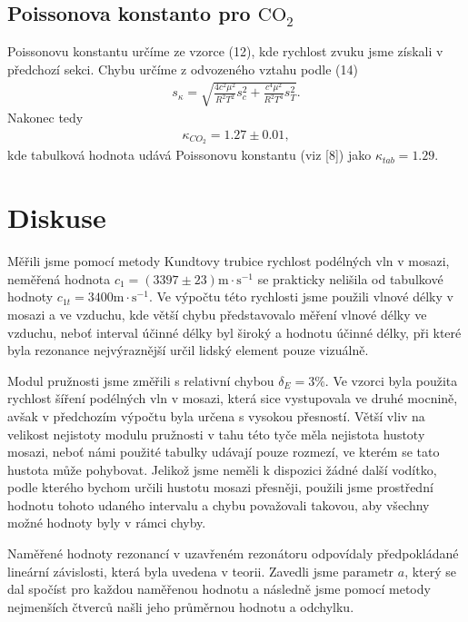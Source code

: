 \subsection{Poissonova konstanto pro $\mathrm{CO_2}$}
\par Poissonovu konstantu určíme ze vzorce (12), kde rychlost zvuku jsme získali v předchozí sekci.
Chybu určíme z odvozeného vztahu podle (14)
\begin{align}
    s_{\kappa} = \sqrt{\frac{4c^2 \mu^2 }{R^2 T^2}s^2_c + \frac{c^4 \mu^2}{R^2 T^4}s^2_T}.
\end{align}
Nakonec tedy
\begin{align*}
    \kappa_{CO_2} = 1.27 \pm 0.01,
\end{align*}
kde tabulková hodnota udává Poissonovu konstantu (viz [8]) jako $\kappa_{tab} = 1.29$.
\section{Diskuse}
\par Měřili jsme pomocí metody Kundtovy trubice rychlost podélných vln v mosazi, neměřená hodnota $c_1 = (3397 \pm 23)\mathrm{m \cdot s^{-1}}$ se prakticky nelišila od tabulkové hodnoty $c_{1t} = 3400\mathrm{m \cdot s^{-1}}$. Ve výpočtu této rychlosti jsme použili vlnové délky v mosazi a ve vzduchu, kde větší chybu představovalo měření vlnové délky ve vzduchu, neboť interval účinné délky byl široký a hodnotu účinné délky, při které byla rezonance nejvýraznější určil lidský element pouze vizuálně. 
\par Modul pružnosti jsme změřili s relativní chybou $\delta_E = 3 \%$. Ve vzorci byla použita rychlost šíření podélných vln v mosazi, která sice vystupovala ve druhé mocnině, avšak v předchozím výpočtu byla určena s vysokou přesností. Větší vliv na velikost nejistoty modulu pružnosti v tahu této tyče měla nejistota hustoty mosazi, neboť námi použité tabulky udávají pouze rozmezí, ve kterém se tato hustota může pohybovat. Jelikož jsme neměli k dispozici žádné další vodítko, podle kterého bychom určili hustotu mosazi přesněji, použili jsme prostřední hodnotu tohoto udaného intervalu a chybu považovali takovou, aby všechny možné hodnoty byly v rámci chyby. 
\par Naměřené hodnoty rezonancí v uzavřeném rezonátoru odpovídaly předpokládané lineární závislosti, která byla uvedena v teorii.
Zavedli jsme parametr $a$, který se dal spočíst pro každou naměřenou hodnotu a následně jsme pomocí metody nejmenších čtverců našli jeho průměrnou hodnotu a odchylku. 
